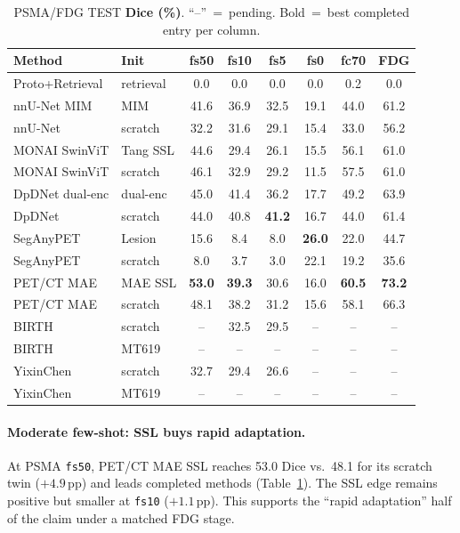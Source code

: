 \documentclass{article} %
\begin{document}
\begin{table}[t]
\caption{PSMA/FDG TEST \textbf{Dice (\%)}. ``--''~=~pending.
Bold~=~best completed entry per column.}
\label{tab:dice}
\centering
\scriptsize
\setlength{\tabcolsep}{3.5pt}
\begin{tabular}{llcccccc}
\toprule
Method & Init & fs50 & fs10 & fs5 & fs0 & fc70 & FDG \\
\midrule
Proto+Retrieval & retrieval & 0.0 & 0.0 & 0.0 & 0.0 & 0.2 & 0.0 \\
nnU-Net MIM & MIM & 41.6 & 36.9 & 32.5 & 19.1 & 44.0 & 61.2 \\
nnU-Net & scratch & 32.2 & 31.6 & 29.1 & 15.4 & 33.0 & 56.2 \\
MONAI SwinViT & Tang SSL & 44.6 & 29.4 & 26.1 & 15.5 & 56.1 & 61.0 \\
MONAI SwinViT & scratch & 46.1 & 32.9 & 29.2 & 11.5 & 57.5 & 61.0 \\
DpDNet dual-enc & dual-enc & 45.0 & 41.4 & 36.2 & 17.7 & 49.2 & 63.9 \\
DpDNet & scratch & 44.0 & 40.8 & \textbf{41.2} & 16.7 & 44.0 & 61.4 \\
SegAnyPET & Lesion & 15.6 & 8.4 & 8.0 & \textbf{26.0} & 22.0 & 44.7 \\
SegAnyPET & scratch & 8.0 & 3.7 & 3.0 & 22.1 & 19.2 & 35.6 \\
PET/CT MAE & MAE SSL & \textbf{53.0} & \textbf{39.3} & 30.6 & 16.0 & \textbf{60.5} & \textbf{73.2} \\
PET/CT MAE & scratch & 48.1 & 38.2 & 31.2 & 15.6 & 58.1 & 66.3 \\
BIRTH & scratch & -- & 32.5 & 29.5 & -- & -- & -- \\
BIRTH & MT619 & -- & -- & -- & -- & -- & -- \\
YixinChen & scratch & 32.7 & 29.4 & 26.6 & -- & -- & -- \\
YixinChen & MT619 & -- & -- & -- & -- & -- & -- \\
\bottomrule
\end{tabular}
\end{table}

\paragraph{Moderate few-shot: SSL buys rapid adaptation.}
At PSMA \texttt{fs50}, PET/CT MAE SSL reaches 53.0 Dice vs.\ 48.1 for its scratch
twin ($+4.9$\,pp) and leads completed methods (Table~\ref{tab:dice}). The SSL edge
remains positive but smaller at \texttt{fs10} ($+1.1$\,pp). This supports the
``rapid adaptation'' half of the claim under a matched FDG stage.
\end{document}
